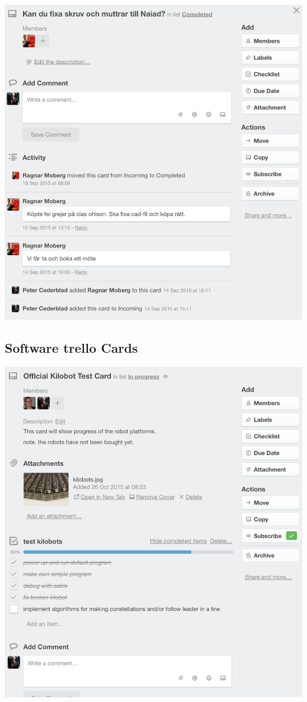     \includegraphics[scale=0.5]{Screenshoot29}


\newpage
\subsection{Software trello Cards}

    \includegraphics[scale=0.5]{Screenshoot30}

